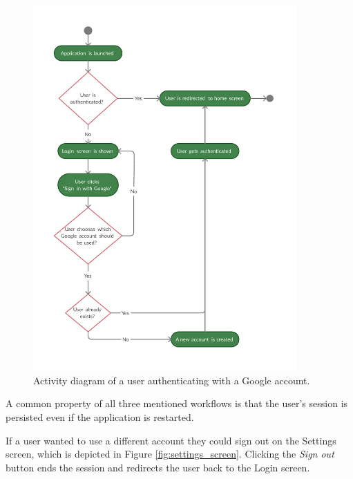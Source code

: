 \documentclass[
  digital, %
  table,   %
  oneside, %
  lof,     %
  lot,     %
]{fithesis3}
\begin{document}
\begin{enumerate}
    \begin{figure}
        \begin{center}
            \includegraphics[width=0.9\textwidth]{figures/diagrams/Google_auth_flow}
        \end{center}
        \caption{Activity diagram of a user authenticating with a Google account.}
        \label{fig:google_auth_flow}
    \end{figure}
\end{enumerate}

A common property of all three mentioned workflows is that the user's session is persisted even if the application is restarted.

If a user wanted to use a different account they could sign out on the Settings screen, which is depicted in Figure \ref{fig:settings_screen}. Clicking the \textit{Sign out} button ends the session and redirects the user back to the Login screen.
\end{document}
